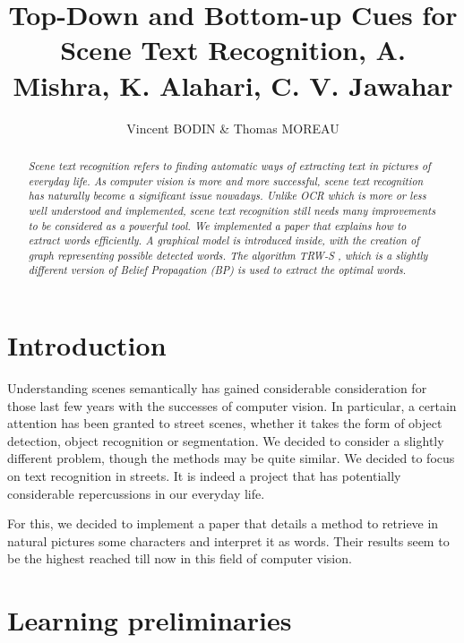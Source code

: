 \documentclass[10pt,a4paper]{article}
\title{Top-Down and Bottom-up Cues for Scene Text Recognition, A. Mishra, K. Alahari, C. V. Jawahar}
\author{Vincent BODIN \& Thomas MOREAU}
\date{}
\begin{document}
\maketitle

\hrulefill
\begin{abstract}
\emph{Scene text recognition refers to finding automatic ways of extracting text in pictures of everyday life. As computer vision is more and more successful, scene text recognition has naturally become a significant issue nowadays. Unlike OCR which is more or less well understood and implemented, scene text recognition still needs many improvements to be considered as a powerful tool. We implemented a paper \cite{Mis} that explains how to extract words efficiently. A graphical model is introduced inside, with the creation of graph representing possible detected words. The algorithm TRW-S \cite{Kol}, which is a slightly different version of Belief Propagation (BP) is used to extract the optimal words.}
\end{abstract}









\section*{Introduction}

Understanding scenes semantically has gained considerable consideration for those last few years with the successes of computer vision. In particular, a certain attention has been granted to street scenes, whether it takes the form of object detection, object recognition or segmentation. We decided to consider a slightly different problem, though the methods may be quite similar. We decided to focus on text recognition in streets. It is indeed a project that has potentially considerable repercussions in our everyday life. 

For this, we decided to implement a paper \cite{Mis} that details a method to retrieve in natural pictures some characters and interpret it as words. Their results seem to be the highest reached till now in this field of computer vision.






\section{Learning preliminaries}
\end{document}

